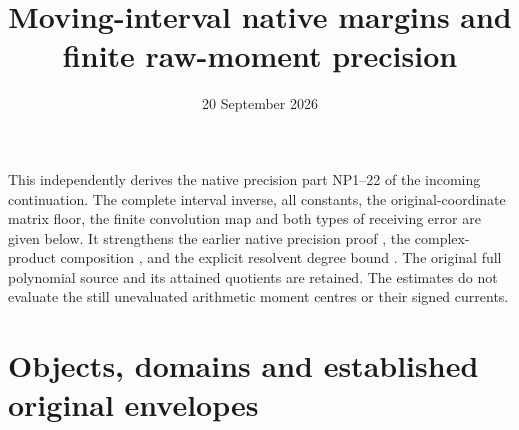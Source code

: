 \documentclass[11pt]{article}
\title{Moving-interval native margins and finite raw-moment precision}
\author{}
\date{20 September 2026}
\begin{document}
\maketitle

This independently derives the native precision part NP1--22 of the
incoming continuation. The complete interval inverse, all constants,
the original-coordinate matrix floor, the finite convolution map and
both types of receiving error are given below. It strengthens the
earlier native precision proof \cite{oldNP}, the complex-product
composition \cite{MC}, and the explicit resolvent degree bound
\cite{NR}. The original full polynomial source and its attained
quotients are retained. The estimates do not evaluate the still
unevaluated arithmetic moment centres or their signed currents.

\section{Objects, domains and established original envelopes}
\end{document}
